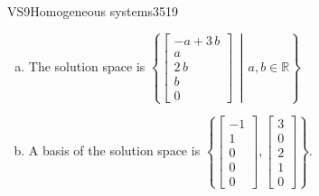 \begin{exercise}{VS9}{Homogeneous systems}{3519}
\begin{exerciseAnswer}
\begin{enumerate}[(a)]
\item The solution space is \( \left\{ \left[\begin{array}{c}
-a + 3 \, b \\
a \\
2 \, b \\
b \\
0
\end{array}\right] \,\middle|\, a,b \in\mathbb R \right\} \) 
\item A basis of the solution space is \(\left\{ \left[\begin{array}{c}
-1 \\
1 \\
0 \\
0 \\
0
\end{array}\right] , \left[\begin{array}{c}
3 \\
0 \\
2 \\
1 \\
0
\end{array}\right] \right\}\).
\end{enumerate}

     \end{exerciseAnswer}
 \end{exercise}


